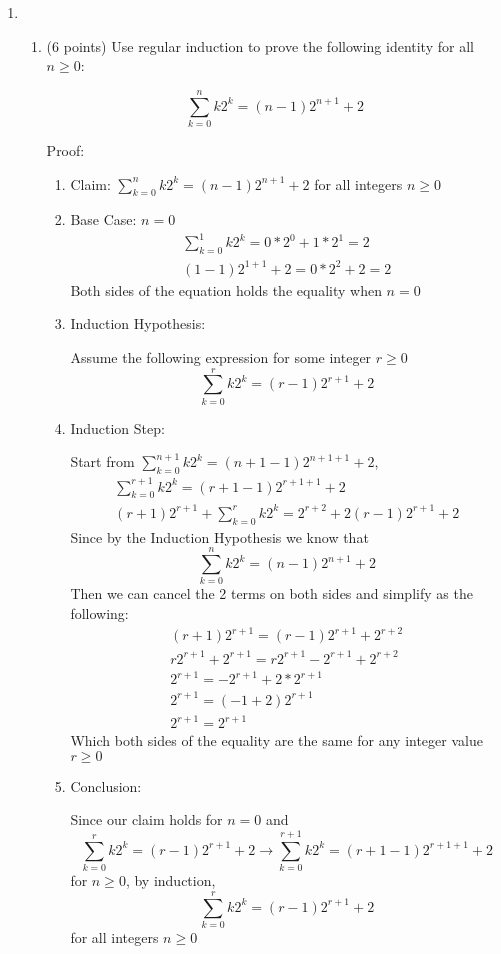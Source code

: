 \documentclass[10pt,letterpaper,unboxed,cm]{article}
\begin{document}
\begin{enumerate}
\item
\begin{enumerate}
\item (6 points)
Use regular induction to prove the following identity for all $n\geq 0$:

$$\sum_{k=0}^n k2^k = (n-1)2^{n+1} + 2$$

Proof:
\begin{enumerate}
    \item Claim: $\sum_{k=0}^{n} k2^k = (n-1)2^{n+1} + 2$ for all integers $n \geq 0$
    \item Base Case: $n=0$
    \begin{align*}
        \sum_{k=0}^{1} k2^k = 0*2^0 + 1*2^1 = 2\\
        (1 - 1)2^{1+1} + 2 = 0*2^2 + 2 = 2
    \end{align*}
    Both sides of the equation holds the equality when $n = 0$
    \item Induction Hypothesis:
    
    
    Assume the following expression for some integer $r \geq 0$
    $$
    \sum_{k = 0}^{r} k2^k = (r-1)2^{r+1} + 2
    $$
    \item Induction Step:

    
    Start from $\sum_{k=0}^{n+1}k2^k = (n+1-1)2^{n+1+1}+2$,
    \begin{align*}
        \sum_{k=0}^{r+1}k2^k = (r+1-1)2^{r+1+1}+2 \\
        (r+1)2^{r+1} + \sum_{k=0}^r k2^k = 2^{r+2} + 2(r-1)2^{r+1} + 2
    \end{align*}
    Since by the Induction Hypothesis we know that
    $$\sum_{k=0}^{n}k2^k = (n-1)2^{n+1}+2$$
    Then we can cancel the 2 terms on both sides and simplify as the following:
    \begin{align*}
        (r+1)2^{r+1} = (r-1)2^{r+1}+2^{r+2} \\
        r2^{r+1} + 2^{r+1} = r2^{r+1} - 2^{r+1} + 2^{r+2} \\
        2^{r+1} = -2^{r+1}+2*2^{r+1} \\
        2^{r+1} = (-1 + 2)2^{r+1} \\
        2^{r+1} = 2^{r+1}
    \end{align*}
    Which both sides of the equality are the same for any integer value $r \geq 0$
    \item Conclusion:

    
    Since our claim holds for $n=0$ and 
    $$\sum_{k = 0}^{r} k2^k = (r-1)2^{r+1} + 2 \xrightarrow{} \sum_{k=0}^{r+1}k2^k = (r+1-1)2^{r+1+1}+2$$
    for $n \geq 0$, by induction, 
    $$\sum_{k = 0}^{r} k2^k = (r-1)2^{r+1} + 2$$
    for all integers $n \geq 0$


\end{enumerate}
\end{enumerate}
\end{enumerate}
\end{document}
